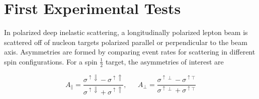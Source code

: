 \section{First Experimental Tests}

In polarized deep inelastic scattering, a longitudinally polarized lepton beam
is scattered off of nucleon targets polarized parallel or perpendicular to the
beam axis. Asymmetries are formed by comparing event rates for scattering in
different spin configurations. For a spin $\frac{1}{2}$ target, the
asymmetries of interest are


\begin{equation}
  A_{\parallel} = \frac{\sigma^{\uparrow \Downarrow} - \sigma^{\uparrow \Uparrow}}{\sigma^{\uparrow \Downarrow} + \sigma^{\uparrow \Uparrow}}, ~~~~~~~
  A_{\perp} = \frac{\sigma^{\uparrow \perp} - \sigma^{\uparrow \top}}{\sigma^{\uparrow \perp} + \sigma^{\uparrow \top}}
\end{equation}

